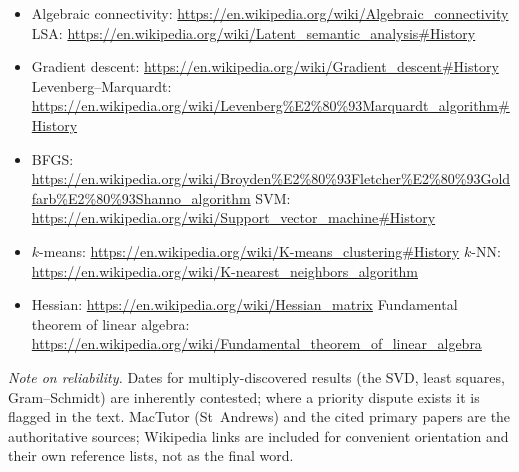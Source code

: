 \documentclass[11pt]{article}
\begin{document}
\begin{itemize}[leftmargin=1.4em,itemsep=1pt]
  \item Algebraic connectivity: \url{https://en.wikipedia.org/wiki/Algebraic_connectivity} \quad
        LSA: \url{https://en.wikipedia.org/wiki/Latent_semantic_analysis\#History}
  \item Gradient descent: \url{https://en.wikipedia.org/wiki/Gradient_descent\#History} \quad
        Levenberg--Marquardt: \url{https://en.wikipedia.org/wiki/Levenberg\%E2\%80\%93Marquardt_algorithm\#History}
  \item BFGS: \url{https://en.wikipedia.org/wiki/Broyden\%E2\%80\%93Fletcher\%E2\%80\%93Goldfarb\%E2\%80\%93Shanno_algorithm} \quad
        SVM: \url{https://en.wikipedia.org/wiki/Support_vector_machine\#History}
  \item $k$-means: \url{https://en.wikipedia.org/wiki/K-means_clustering\#History} \quad
        $k$-NN: \url{https://en.wikipedia.org/wiki/K-nearest_neighbors_algorithm}
  \item Hessian: \url{https://en.wikipedia.org/wiki/Hessian_matrix} \quad
        Fundamental theorem of linear algebra: \url{https://en.wikipedia.org/wiki/Fundamental_theorem_of_linear_algebra}
\end{itemize}
\normalsize

\vspace{0.5em}
\noindent\emph{Note on reliability.} Dates for multiply-discovered results (the
SVD, least squares, Gram--Schmidt) are inherently contested; where a priority
dispute exists it is flagged in the text. MacTutor (St~Andrews) and the cited
primary papers are the authoritative sources; Wikipedia links are included for
convenient orientation and their own reference lists, not as the final word.
\end{document}
